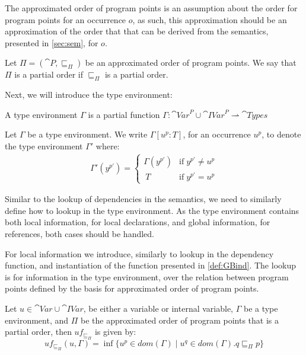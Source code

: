 \documentclass[acmsmall,sigplan]{acmart}
\begin{document}
The approximated order of program points is an assumption about the order for program points for an occurrence $o$, as such, this approximation should be an approximation of the order that that can be derived from the semantics, presented in \cref{sec:sem}, for $o$.

\begin{definition}
	Let $\Pi=(\cat{P},\sqsubseteq_\Pi)$ be an approximated order of program points.
	We say that $\Pi$ is a partial order if $\sqsubseteq_\Pi$ is a partial order.
\end{definition}
\bigskip

Next, we will introduce the type environment:
\begin{definition}
	A type environment $\Gamma$ is a partial function $\Gamma:\cat{Var}^P\cup\cat{IVar}^P\rightharpoonup\cat{Types}$
\end{definition}

\begin{definition}
	Let $\Gamma$ be a type environment.
	We write $\Gamma[u^p:T]$, for an occurrence $u^p$, to denote the type environment $\Gamma'$ where:
	\begin{align*}
		\Gamma'(y^{p'})=
		\left\{\begin{matrix}
			\Gamma(y^{p'}) & \mbox{if}\;y^{p'}\neq u^{p}\\\	 
			T & \mbox{if}\;y^{p'}=u^{p}
		\end{matrix}\right.
	\end{align*}
\end{definition}

Similar to the lookup of dependencies in the semantics, we need to similarly define how to lookup in the type environment.
As the type environment contains both local information, for local declarations, and global information, for references, both cases should be handled.

For local information we introduce, similarly to lookup in the dependency function, and instantiation of the function presented in \cref{def:GBind}.
The lookup is for information in the type environment, over the relation between program points defined by the basis for approximated order of program points.

\begin{definition}[]\label{def:GBindPi}
	Let $u\in \cat{Var}\cup\cat{IVar}$, be either a variable or internal variable, $\Gamma$ be a type environment, and $\Pi$ be the approximated order of program points that is a partial order, then $uf_{\sqsubseteq_\Pi}$ is given by:
	$$uf_{\sqsubseteq_\Pi}(u,\Gamma)=\inf\{u^p\in dom(\Gamma)\mid u^q\in dom(\Gamma).q\sqsubseteq_\Pi p\}$$
\end{definition}
\end{document}
